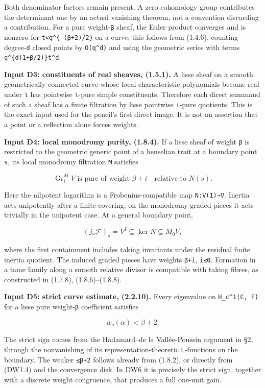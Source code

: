 \documentclass[
]{report}
\begin{document}
Both denominator factors remain present. A zero cohomology group
contributes the determinant one by an actual vanishing theorem, not a
convention discarding a contribution. For a pure weight-\texttt{β}
sheaf, the Euler product converges and is nonzero for
\texttt{\textbar{}t\textbar{}\textless{}q\^{}\{-(β+2)/2\}} on a curve;
this follows from (1.4.6), counting degree-\texttt{d} closed points by
\texttt{O(q\^{}d)} and using the geometric series with terms
\texttt{q\^{}\{d(1+β/2)\}\textbar{}t\textbar{}\^{}d}.

\textbf{Input D3: constituents of real sheaves, (1.5.1).} A lisse sheaf
on a smooth geometrically connected curve whose local characteristic
polynomials become real under \texttt{ι} has pointwise \texttt{ι}-pure
simple constituents. Therefore each direct summand of such a sheaf has a
finite filtration by lisse pointwise \texttt{ι}-pure quotients. This is
the exact input used for the pencil's first direct image. It is not an
assertion that a point or a reflection alone forces weights.

\textbf{Input D4: local monodromy purity, (1.8.4).} If a lisse sheaf of
weight \texttt{β} is restricted to the geometric generic point of a
henselian trait at a boundary point \texttt{s}, its local monodromy
filtration \texttt{M} satisfies

\[
\operatorname{Gr}_i^M V\text{ is pure of weight }\beta+i
\quad\text{relative to }N(s).
\tag{DW1.5}
\]

Here the nilpotent logarithm is a Frobenius-compatible map
\texttt{N:V(1)→V}. Inertia acts unipotently after a finite covering; on
the monodromy graded pieces it acts trivially in the unipotent case. At
a general boundary point,

\[
(j_*\mathcal F)_{\bar s}=V^I
\subseteq\ker N\subseteq M_0V,
\tag{DW1.6}
\]

where the first containment includes taking invariants under the
residual finite inertia quotient. The induced graded pieces have weights
\texttt{β+i}, \texttt{i≤0}. Formation in a tame family along a smooth
relative divisor is compatible with taking fibres, as constructed in
(1.7.8), (1.8.6)--(1.8.8).

\textbf{Input D5: strict curve estimate, (2.2.10).} Every eigenvalue on
\texttt{H\_c\^{}1(C,\ F)} for a lisse pure weight-\texttt{β} coefficient
satisfies

\[
w_q(\alpha)<\beta+2.
\tag{DW1.7}
\]

The strict sign comes from the Hadamard--de la Vallée-Poussin argument
in §2, through the nonvanishing of its representation-theoretic
\texttt{L}-functions on the boundary. The weaker \texttt{≤β+2} follows
already from (1.8.2), or directly from (DW1.4) and the convergence disk.
In DW6 it is precisely the strict sign, together with a discrete weight
congruence, that produces a full one-unit gain.
\end{document}
